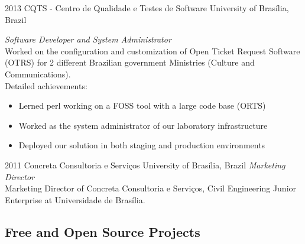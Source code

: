 \documentclass[]{friggeri-cv} %
\begin{document}
\begin{entrylist}

\entry
{2013}
{CQTS - Centro de Qualidade e Testes de Software}
{University of Brasília, Brazil}
{\emph{Software Developer and System Administrator} \\
  Worked on the configuration and customization of Open Ticket Request Software (OTRS) for 2 different Brazilian government Ministries (Culture and Communications). \\
Detailed achievements:
\begin{itemize}
  \item Lerned perl working on a FOSS tool with a large code base (ORTS)
  \item Worked as the system administrator of our laboratory infrastructure
  \item Deployed our solution in both staging and production environments
\end{itemize}}


\entry
{2011}
{Concreta Consultoria e Serviços}
{University of Brasília, Brazil}
{\emph{Marketing Director} \\
Marketing Director of Concreta Consultoria e Serviços, Civil Engineering Junior Enterprise at Universidade de Brasília. \\
}


\end{entrylist}

\subsection{Free and Open Source Projects}
\end{document}
